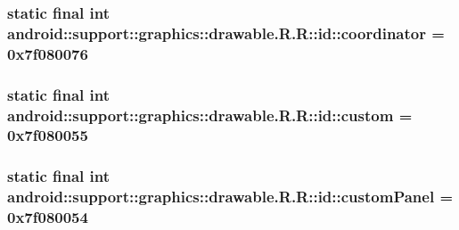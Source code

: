 \hypertarget{classandroid_1_1support_1_1graphics_1_1drawable_1_1_r_1_1id_9c5829cb2024cee8d99620c29102e74f}{
\subsubsection[{coordinator}]{\setlength{\rightskip}{0pt plus 5cm}static final int android::support::graphics::drawable.R.R::id::coordinator = 0x7f080076}}
\label{classandroid_1_1support_1_1graphics_1_1drawable_1_1_r_1_1id_9c5829cb2024cee8d99620c29102e74f}


\hypertarget{classandroid_1_1support_1_1graphics_1_1drawable_1_1_r_1_1id_329b91c97abd9ac147cf6bb5cb5c8a20}{
\subsubsection[{custom}]{\setlength{\rightskip}{0pt plus 5cm}static final int android::support::graphics::drawable.R.R::id::custom = 0x7f080055}}
\label{classandroid_1_1support_1_1graphics_1_1drawable_1_1_r_1_1id_329b91c97abd9ac147cf6bb5cb5c8a20}


\hypertarget{classandroid_1_1support_1_1graphics_1_1drawable_1_1_r_1_1id_d8a0c8faedba19e39cedbabed538261b}{
\subsubsection[{customPanel}]{\setlength{\rightskip}{0pt plus 5cm}static final int android::support::graphics::drawable.R.R::id::customPanel = 0x7f080054}}
\label{classandroid_1_1support_1_1graphics_1_1drawable_1_1_r_1_1id_d8a0c8faedba19e39cedbabed538261b}


